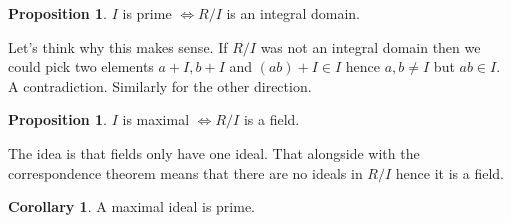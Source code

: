 \documentclass[11pt,a4paper]{article}
\theoremstyle{definition}
\newtheorem{corollary}[theorem]{Corollary}
\newtheorem{proposition}[theorem]{Proposition}
\begin{document}
\begin{proposition}
$I$ is prime $\iff R/I$ is an integral domain.
\end{proposition}
Let's think why this makes sense. If $R/I$ was not an integral domain then we could pick two elements $a + I, b + I$ and $(ab) + I \in I$ hence $a,b \neq I$ but $ab \in I$. A contradiction. Similarly for the other direction.
\\
\begin{proposition}
$I$ is maximal $ \iff R/I$ is a field.
\end{proposition}
The idea is that fields only have one ideal. That alongside with the correspondence theorem means that there are no ideals in $R/I$ hence it is a field.

\begin{corollary}
A maximal ideal is prime.
\end{corollary}
\end{document}
